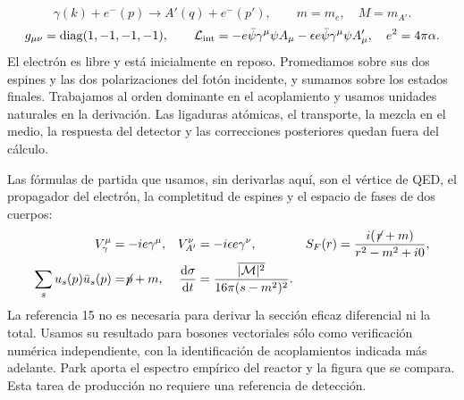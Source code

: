 \section{}
\begin{equation}
\gamma(k)+e^-(p)\longrightarrow A'(q)+e^-(p'),\qquad m=m_e,\quad M=m_{A'}.
\end{equation}
\begin{equation}
g_{\mu\nu}=\operatorname{diag}(1,-1,-1,-1),\qquad
\mathcal L_{\rm int}=-e\bar\psi\gamma^\mu\psi A_\mu-\epsilon e\bar\psi\gamma^\mu\psi A'_\mu,
\quad e^2=4\pi\alpha.
\end{equation}
{El electrón es libre y está inicialmente en reposo. Promediamos sobre sus dos espines y las dos polarizaciones del fotón incidente, y sumamos sobre los estados finales. Trabajamos al orden dominante en el acoplamiento y usamos unidades naturales en la derivación. Las ligaduras atómicas, el transporte, la mezcla en el medio, la respuesta del detector y las correcciones posteriores quedan fuera del cálculo.}

{Las fórmulas de partida que usamos, sin derivarlas aquí, son el vértice de QED, el propagador del electrón, la completitud de espines y el espacio de fases de dos cuerpos:}
\begin{align}
V^\mu_\gamma&=-ie\gamma^\mu,&V^\nu_{A'}&=-i\epsilon e\gamma^\nu,&
S_F(r)&=\frac{i(\not\!r+m)}{r^2-m^2+i0},\\
\sum_su_s(p)\bar u_s(p)&=\not\!p+m,&
\frac{\mathrm{d}\sigma}{\mathrm{d} t}&=\frac{\overline{|\mathcal M|^2}}{16\pi(s-m^2)^2}.
\end{align}
{La referencia 15 no es necesaria para derivar la sección eficaz diferencial ni la total. Usamos su resultado para bosones vectoriales sólo como verificación numérica independiente, con la identificación de acoplamientos indicada más adelante. Park aporta el espectro empírico del reactor y la figura que se compara. Esta tarea de producción no requiere una referencia de detección.}


